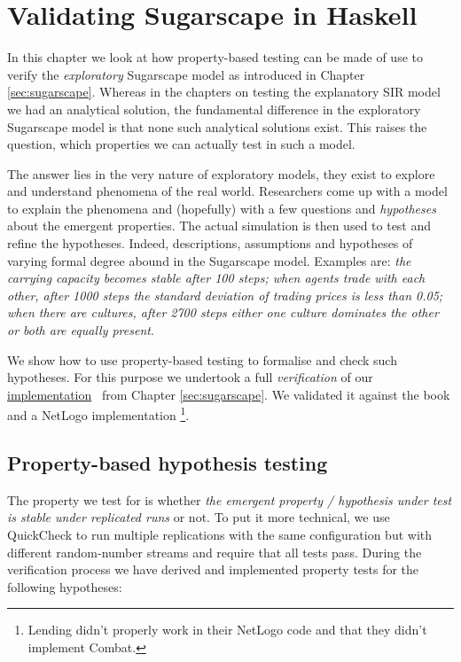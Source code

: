 \chapter{Validating Sugarscape in Haskell}
\label{app:validating_sugarscape}

In this chapter we look at how property-based testing can be made of use to verify the \textit{exploratory} Sugarscape model \cite{epstein_growing_1996} as introduced in Chapter \ref{sec:sugarscape}. Whereas in the chapters on testing the explanatory SIR model we had an analytical solution, the fundamental difference in the exploratory Sugarscape model is that none such analytical solutions exist. This raises the question, which properties we can actually test in such a model.

The answer lies in the very nature of exploratory models, they exist to explore and understand phenomena of the real world. Researchers come up with a model to explain the phenomena and (hopefully) with a few questions and \textit{hypotheses} about the emergent properties. The actual simulation is then used to test and refine the hypotheses. Indeed, descriptions, assumptions and hypotheses of varying formal degree abound in the Sugarscape model. Examples are: \textit{the carrying capacity becomes stable after 100 steps; when agents trade with each other, after 1000 steps the standard deviation of trading prices is less than 0.05; when there are cultures, after 2700 steps either one culture dominates the other or both are equally present}. 

We show how to use property-based testing to formalise and check such hypotheses. For this purpose we undertook a full \textit{verification} of our \href{https://github.com/thalerjonathan/haskell-sugarscape}{implementation}~\cite{thaler_sugarscape_repository} from Chapter \ref{sec:sugarscape}. We validated it against the book \cite{epstein_growing_1996} and a NetLogo implementation \cite{weaver_replicating_2009}  \footnote{Lending didn't properly work in their NetLogo code and that they didn't implement Combat.}.

\section{Property-based hypothesis testing}
The property we test for is whether \textit{the emergent property / hypothesis under test is stable under replicated runs} or not. To put it more technical, we use QuickCheck to run multiple replications with the same configuration but with different random-number streams and require that all tests pass. During the verification process we have derived and implemented property tests for the following hypotheses:

